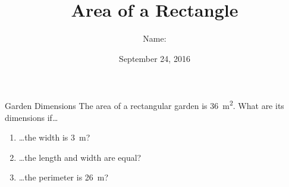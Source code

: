 \documentclass[14pt,letterpaper]{article}
\title{Area of a Rectangle}
\author{Name: \underline{\hspace{5cm}}}
\date{September 24, 2016}
\begin{document}
\HomeworkTitle

\thispagestyle{empty}

\begin{problem}{Garden Dimensions}
 The area of a rectangular garden is \SI{36}{\metre\squared}. What are its
 dimensions if\ldots

 \begin{enumerate}[\hspace{1cm}a.]
   \item \ldots{}the width is \SI{3}{\metre}?
   \item \ldots{}the length and width are equal?
   \item \ldots{}the perimeter is \SI{26}{\metre}?
 \end{enumerate}
\end{problem}
\end{document}
